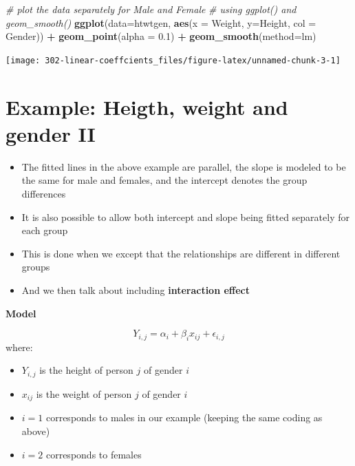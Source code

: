 \documentclass[
]{book}
\newenvironment{Shaded}{\begin{snugshade}}{\end{snugshade}}
\newcommand{\CommentTok}[1]{\textcolor[rgb]{0.56,0.35,0.01}{\textit{#1}}}
\newcommand{\DataTypeTok}[1]{\textcolor[rgb]{0.13,0.29,0.53}{#1}}
\newcommand{\FloatTok}[1]{\textcolor[rgb]{0.00,0.00,0.81}{#1}}
\newcommand{\KeywordTok}[1]{\textcolor[rgb]{0.13,0.29,0.53}{\textbf{#1}}}
\newcommand{\NormalTok}[1]{#1}
\newcommand{\OperatorTok}[1]{\textcolor[rgb]{0.81,0.36,0.00}{\textbf{#1}}}
\newcommand{\StringTok}[1]{\textcolor[rgb]{0.31,0.60,0.02}{#1}}
\providecommand{\tightlist}{%
  \setlength{\itemsep}{0pt}\setlength{\parskip}{0pt}}
\theoremstyle{definition}
\theoremstyle{definition}
\theoremstyle{definition}
\theoremstyle{remark}
\begin{document}
\begin{Shaded}
\begin{Highlighting}[]
\CommentTok{\# plot the data separately for Male and Female}
\CommentTok{\# using ggplot() and geom\_smooth()}
\KeywordTok{ggplot}\NormalTok{(}\DataTypeTok{data=}\NormalTok{htwtgen, }\KeywordTok{aes}\NormalTok{(}\DataTypeTok{x =}\NormalTok{ Weight, }\DataTypeTok{y=}\NormalTok{Height, }\DataTypeTok{col =}\NormalTok{ Gender)) }\OperatorTok{+}\StringTok{ }
\StringTok{  }\KeywordTok{geom\_point}\NormalTok{(}\DataTypeTok{alpha =} \FloatTok{0.1}\NormalTok{) }\OperatorTok{+}\StringTok{ }
\StringTok{  }\KeywordTok{geom\_smooth}\NormalTok{(}\DataTypeTok{method=}\NormalTok{lm)}
\end{Highlighting}
\end{Shaded}

\begin{center}\texttt{[image: 302-linear-coeffcients\_files/figure-latex/unnamed-chunk-3-1]} \end{center}

\hypertarget{example-heigth-weight-and-gender-ii}{%
\section{Example: Heigth, weight and gender II}\label{example-heigth-weight-and-gender-ii}}

\begin{itemize}
\tightlist
\item
  The fitted lines in the above example are parallel, the slope is modeled to be the same for male and females, and the intercept denotes the group differences
\item
  It is also possible to allow both intercept and slope being fitted separately for each group
\item
  This is done when we except that the relationships are different in different groups
\item
  And we then talk about including \textbf{interaction effect}
\end{itemize}

\textbf{Model}

\[Y_{i,j} = \alpha_i + \beta_ix_{ij} + \epsilon_{i,j}\]
where:

\begin{itemize}
\tightlist
\item
  \(Y_{i,j}\) is the height of person \(j\) of gender \(i\)
\item
  \(x_{ij}\) is the weight of person \(j\) of gender \(i\)
\item
  \(i=1\) corresponds to males in our example (keeping the same coding as above)
\item
  \(i=2\) corresponds to females
\end{itemize}
\end{document}
